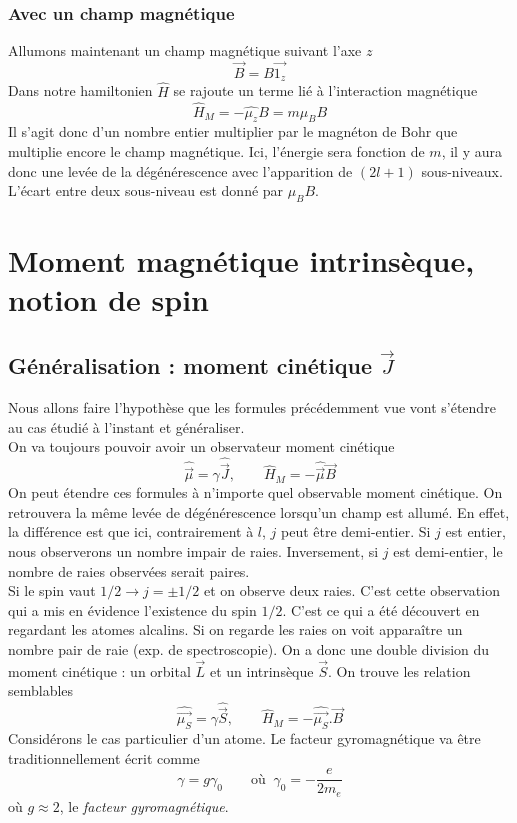 		\subsubsection{Avec un champ magnétique}
		Allumons maintenant un champ magnétique suivant l'axe $z$ 
		\begin{equation}
		\vec{B}=B\vec{1_z}
		\end{equation}
		Dans notre hamiltonien $\hat H$ se rajoute un terme lié à l'interaction magnétique
		\begin{equation}
		\hat{H}_M = -\hat{\mu_z}B = m\mu_BB
		\end{equation}
		Il s'agit donc d'un nombre entier multiplier par le magnéton de Bohr que multiplie 
		encore le champ magnétique. Ici, l'énergie sera fonction de $m$, il y aura donc une 
		levée de la dégénérescence avec l'apparition de $(2l+1)$ sous-niveaux. L'écart entre 
		deux sous-niveau est donné par $\mu_BB$.
		
	
\section{Moment magnétique intrinsèque, notion de spin}
	\subsection{Généralisation : moment cinétique $\vec{J}$}
	Nous allons faire l'hypothèse que les formules précédemment vue vont s'étendre au cas 
	étudié à l'instant et généraliser. \\
	On va toujours pouvoir avoir un observateur moment cinétique
	\begin{equation}
	\hat{\vec{\mu}} = \gamma\hat{\vec{J}},\qquad \hat{H}_M = -\hat{\vec{\mu}}\vec{B}
	\end{equation}
	On peut étendre ces formules à n'importe quel observable moment cinétique. On 
	retrouvera la même levée de dégénérescence lorsqu'un champ est allumé. En effet,
	la différence est que ici, contrairement à $l$, $j$ peut être demi-entier. Si 
	$j$ est entier, nous observerons un nombre impair de raies. Inversement, si $j$ 
	est demi-entier, le nombre de raies observées serait paires.\\
	
	Si le spin vaut $1/2\rightarrow j = \pm 1/2$ et on observe deux raies. C'est cette 
	observation qui a mis en évidence l'existence du spin $1/2$.	
	C'est ce qui a été découvert en regardant les atomes alcalins.  Si on regarde 
	les raies on voit apparaître un nombre pair de raie (exp. de spectroscopie). 
	On a donc une double division du moment cinétique : un orbital $\vec{L}$ et un 
	intrinsèque $\vec{S}$. On trouve les relation semblables
	\begin{equation}
	\hat{\vec{\mu_S}} = \gamma\hat{\vec{S}},\qquad \hat{H}_M = -\hat{\vec{\mu_S}}.\vec{B}
	\end{equation}
	Considérons le cas particulier d'un atome. Le facteur gyromagnétique va être 
	traditionnellement 	écrit comme
	\begin{equation}
	\gamma = g\gamma_0\qquad \text{où }\ \gamma_0 = -\frac{e}{2m_e}
	\end{equation}
	où $g\approx 2$, le \textit{facteur gyromagnétique}.
	
